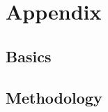 \appendix
\renewcommand*\thesection{\Alph{section}}
\renewcommand*\thesubsection{\Alph{section}.{\arabic{subsection}}}
\renewcommand*\thefigure{\Alph{section}.{\arabic{figure}}}
\renewcommand*\thetable{\Alph{section}.{\arabic{table}}}
\renewcommand*\theequation{\Alph{section}.{\arabic{equation}}}
\chapter*{Appendix}
\section{Basics}



\newpage
\section{Methodology}
\setcounter{figure}{0}
\setcounter{table}{0}
\setcounter{equation}{0}
